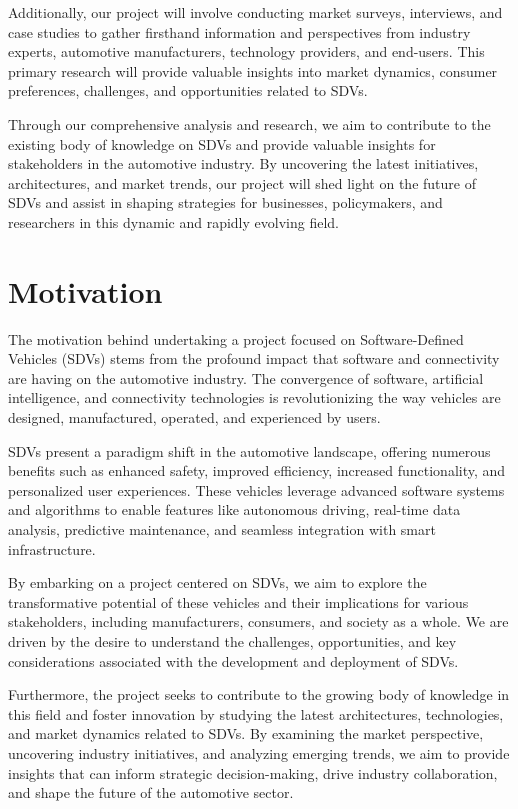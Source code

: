 \documentclass[
12pt,
oneside, 
onehalfspacing, 
nolistspacing, 
parskip, 
chapterinoneline, 
]{AASTCOMPUTER}
\begin{document}
Additionally, our project will involve conducting market surveys, interviews, and case studies to gather firsthand information and perspectives from industry experts, automotive manufacturers, technology providers, and end-users. This primary research will provide valuable insights into market dynamics, consumer preferences, challenges, and opportunities related to SDVs.

Through our comprehensive analysis and research, we aim to contribute to the existing body of knowledge on SDVs and provide valuable insights for stakeholders in the automotive industry. By uncovering the latest initiatives, architectures, and market trends, our project will shed light on the future of SDVs and assist in shaping strategies for businesses, policymakers, and researchers in this dynamic and rapidly evolving field.

\section{Motivation}
The motivation behind undertaking a project focused on Software-Defined Vehicles (SDVs) stems from the profound impact that software and connectivity are having on the automotive industry. The convergence of software, artificial intelligence, and connectivity technologies is revolutionizing the way vehicles are designed, manufactured, operated, and experienced by users.

SDVs present a paradigm shift in the automotive landscape, offering numerous benefits such as enhanced safety, improved efficiency, increased functionality, and personalized user experiences. These vehicles leverage advanced software systems and algorithms to enable features like autonomous driving, real-time data analysis, predictive maintenance, and seamless integration with smart infrastructure.

By embarking on a project centered on SDVs, we aim to explore the transformative potential of these vehicles and their implications for various stakeholders, including manufacturers, consumers, and society as a whole. We are driven by the desire to understand the challenges, opportunities, and key considerations associated with the development and deployment of SDVs.

Furthermore, the project seeks to contribute to the growing body of knowledge in this field and foster innovation by studying the latest architectures, technologies, and market dynamics related to SDVs. By examining the market perspective, uncovering industry initiatives, and analyzing emerging trends, we aim to provide insights that can inform strategic decision-making, drive industry collaboration, and shape the future of the automotive sector.
\end{document}

